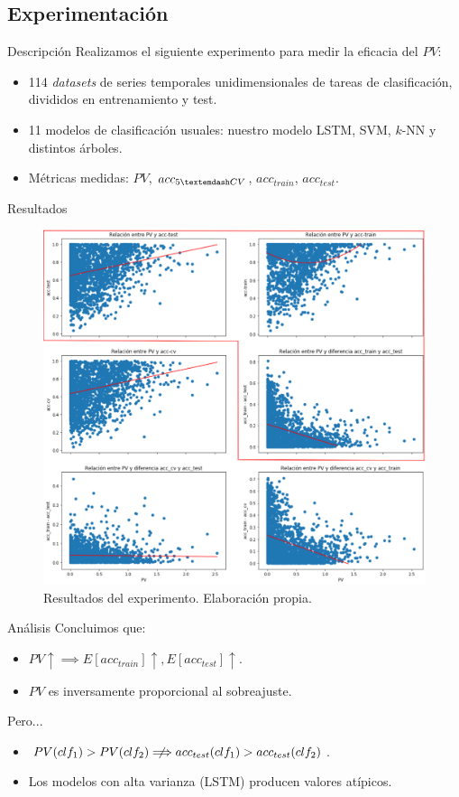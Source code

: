 \documentclass[spanish]{beamer}
\begin{document}
\subsection{Experimentación}

\begin{frame}{Descripción}
  Realizamos el siguiente experimento para medir la eficacia del $PV$:
  \begin{itemize}
    \item 114 \emph{datasets} de series temporales unidimensionales de tareas de clasificación, divididos en entrenamiento y test.
    \item 11 modelos de clasificación usuales: nuestro modelo LSTM, SVM, $k$-NN y distintos árboles.
    \item Métricas medidas: $PV$, $acc_{5\textemdash CV}$, $acc_{train}$, $acc_{test}$.
  \end{itemize}
\end{frame}

\begin{frame}{Resultados}
  \begin{figure}
    \centering
    \includegraphics[width=.74\textwidth]{img/res-pv}
    \caption{Resultados del experimento. Elaboración propia.}
  \end{figure}
\end{frame}

\begin{frame}{Análisis}
  Concluimos que:
  \begin{itemize}
    \item $PV \uparrow \implies E[acc_{train}]\uparrow, E[acc_{test}] \uparrow$.
    \item $PV$ es inversamente proporcional al sobreajuste.
  \end{itemize}
  \pause

  Pero...
  \begin{itemize}
    \item $PV(clf_1) > PV(clf_2) \centernot\Longrightarrow acc_{test}(clf_1) > acc_{test}(clf_2)$.
    \item Los modelos con alta varianza (LSTM) producen valores atípicos.
  \end{itemize}

\end{frame}
\end{document}
